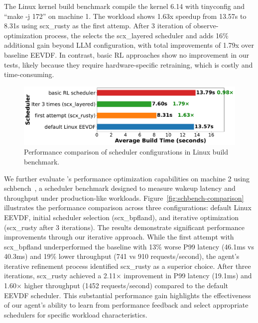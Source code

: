 
The Linux kernel build benchmark compile the kernel 6.14 with tinyconfig and ``make -j 172'' on machine 1. The workload shows 1.63x speedup from 13.57s to 8.31s using scx\_rusty as the first attemp. After 3 iteration of observe-optimization process, the \agent selects the scx\_layered scheduler and adds 16\% additional gain beyond LLM configuration, with total improvements of 1.79x over baseline EEVDF. In contrast, basic RL approaches show no improvement in our tests, likely because they require hardware-specific retraining, which is costly and time-consuming. 

\begin{figure}[h]
\centering
\includegraphics[width=0.9\columnwidth]{sections/Linux_build_benchmark_results.pdf}
\caption{Performance comparison of scheduler configurations in Linux build benchmark.}
\label{fig:performance-comparison}
\end{figure}

We further evaluate \sys's performance optimization capabilities on machine 2 using schbench~\cite{schbench2016}, a scheduler benchmark designed to measure wakeup latency and throughput under production-like workloads. Figure~\ref{fig:schbench-comparison} illustrates the performance comparison across three configurations: default Linux EEVDF, initial scheduler selection (scx\_bpfland), and iterative optimization (scx\_rusty after 3 iterations). The results demonstrate significant performance improvements through our iterative approach. While the first attempt with scx\_bpfland underperformed the baseline with 13\% worse P99 latency (46.1ms vs 40.3ms) and 19\% lower throughput (741 vs 910 requests/second), the agent's iterative refinement process identified scx\_rusty as a superior choice. After three iterations, scx\_rusty achieved a 2.11× improvement in P99 latency (19.1ms) and 1.60× higher throughput (1452 requests/second) compared to the default EEVDF scheduler. This substantial performance gain highlights the effectiveness of our agent's ability to learn from performance feedback and select appropriate schedulers for specific workload characteristics.

